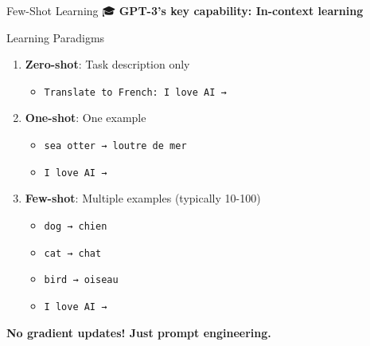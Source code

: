 \documentclass[aspectratio=169]{beamer}
\begin{document}
\begin{frame}[shrink=10]{Few-Shot Learning 🎓}
\small
    \textbf{GPT-3's key capability: In-context learning}

    \vspace{0.3cm}

    \begin{block}{Learning Paradigms}
        \begin{enumerate}\setlength{\itemsep}{0pt}
            \item \textbf{Zero-shot}: Task description only
            \begin{itemize}\setlength{\itemsep}{0pt}
                \item \texttt{Translate to French: I love AI →}
            \end{itemize}

            \vspace{0.3cm}

            \item \textbf{One-shot}: One example
            \begin{itemize}\setlength{\itemsep}{0pt}
                \item \texttt{sea otter → loutre de mer}
                \item \texttt{I love AI →}
            \end{itemize}

            \vspace{0.3cm}

            \item \textbf{Few-shot}: Multiple examples (typically 10-100)
            \begin{itemize}\setlength{\itemsep}{0pt}
                \item \texttt{dog → chien}
                \item \texttt{cat → chat}
                \item \texttt{bird → oiseau}
                \item \texttt{I love AI →}
            \end{itemize}
        \end{enumerate}
    \end{block}

    \vspace{0.3cm}

    \textbf{No gradient updates! Just prompt engineering.}
\end{frame}
\end{document}
